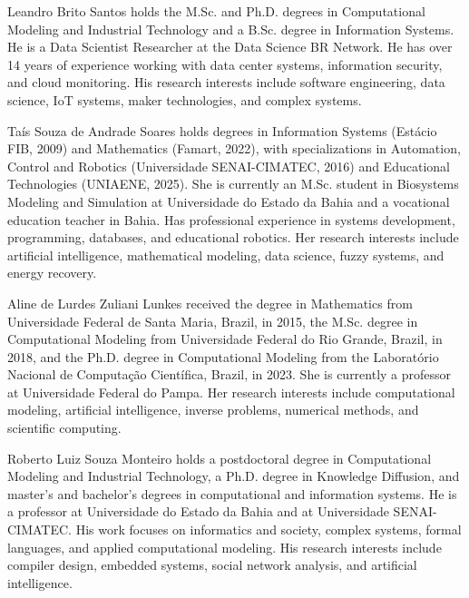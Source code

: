 \documentclass{IEEEoj}
\begin{document}
\begin{IEEEbiographynophoto}{Leandro Brito Santos}
holds the M.Sc. and Ph.D. degrees in Computational Modeling and Industrial
Technology and a B.Sc. degree in Information Systems. He is a Data Scientist
Researcher at the Data Science BR Network. He has over 14 years of experience
working with data center systems, information security, and cloud monitoring.
His research interests include software engineering, data science, IoT
systems, maker technologies, and complex systems.
\end{IEEEbiographynophoto}



\begin{IEEEbiographynophoto}{Ta\'{i}s Souza de Andrade Soares}
holds degrees in Information Systems (Est\'{a}cio FIB, 2009) and Mathematics (Famart, 2022), with specializations in Automation, Control and Robotics (Universidade SENAI-CIMATEC, 2016) and Educational Technologies (UNIAENE, 2025). She is currently an M.Sc. student in Biosystems Modeling and Simulation at Universidade do Estado da Bahia and a vocational education teacher in Bahia. Has professional experience in systems development, programming, databases, and educational robotics. Her research interests include artificial intelligence, mathematical modeling, data science, fuzzy systems, and energy recovery.
\end{IEEEbiographynophoto}


\begin{IEEEbiographynophoto}{Aline de Lurdes Zuliani Lunkes}
received the degree in Mathematics from Universidade Federal de Santa Maria, Brazil, in 2015, the M.Sc. degree in Computational Modeling from Universidade Federal do Rio Grande, Brazil, in 2018, and the Ph.D. degree in Computational Modeling from the Laborat\'{o}rio Nacional de Computa\c{c}\~{a}o Cient\'{i}fica, Brazil, in 2023. She is currently a professor at Universidade Federal do Pampa. Her research interests include computational modeling, artificial intelligence, inverse problems, numerical methods, and scientific computing.
\end{IEEEbiographynophoto}



\begin{IEEEbiographynophoto}{Roberto Luiz Souza Monteiro}
holds a postdoctoral degree in Computational Modeling and Industrial
Technology, a Ph.D. degree in Knowledge Diffusion, and master's and bachelor's
degrees in computational and information systems. He is a professor at
Universidade do Estado da Bahia and at Universidade SENAI-CIMATEC. His
work focuses on informatics and society, complex systems, formal languages,
and applied computational modeling. His research interests include compiler
design, embedded systems, social network analysis, and artificial
intelligence.
\end{IEEEbiographynophoto}
\end{document}
